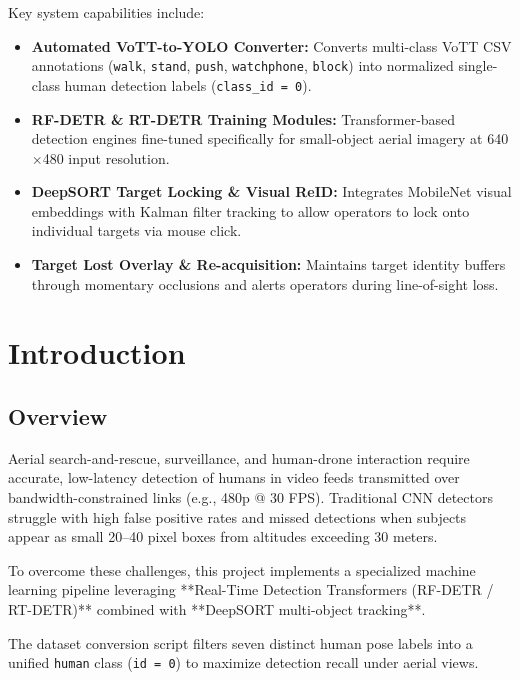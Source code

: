 \documentclass[11pt,a4paper]{article}
\begin{document}
Key system capabilities include:
\begin{itemize}[noitemsep]
    \item \textbf{Automated VoTT-to-YOLO Converter:} Converts multi-class VoTT CSV annotations (\texttt{walk}, \texttt{stand}, \texttt{push}, \texttt{watchphone}, \texttt{block}) into normalized single-class human detection labels (\texttt{class\_id = 0}).
    \item \textbf{RF-DETR \& RT-DETR Training Modules:} Transformer-based detection engines fine-tuned specifically for small-object aerial imagery at 640$\times$480 input resolution.
    \item \textbf{DeepSORT Target Locking \& Visual ReID:} Integrates MobileNet visual embeddings with Kalman filter tracking to allow operators to lock onto individual targets via mouse click.
    \item \textbf{Target Lost Overlay \& Re-acquisition:} Maintains target identity buffers through momentary occlusions and alerts operators during line-of-sight loss.
\end{itemize}

\newpage

\section{Introduction}

\subsection{Overview}
Aerial search-and-rescue, surveillance, and human-drone interaction require accurate, low-latency detection of humans in video feeds transmitted over bandwidth-constrained links (e.g., 480p @ 30 FPS). Traditional CNN detectors struggle with high false positive rates and missed detections when subjects appear as small 20--40 pixel boxes from altitudes exceeding 30 meters.

To overcome these challenges, this project implements a specialized machine learning pipeline leveraging **Real-Time Detection Transformers (RF-DETR / RT-DETR)** combined with **DeepSORT multi-object tracking**.

\begin{notebox}
    The dataset conversion script filters seven distinct human pose labels into a unified \texttt{human} class (\texttt{id = 0}) to maximize detection recall under aerial views.
\end{notebox}
\end{document}
